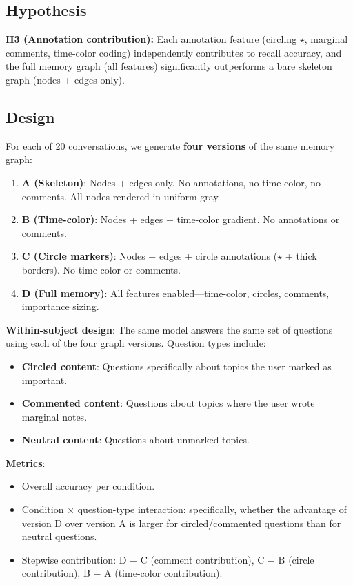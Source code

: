 \documentclass[11pt,a4paper]{article}
\begin{document}
\subsection{Hypothesis}

\textbf{H3 (Annotation contribution):} Each annotation feature (circling $\star$, marginal comments, time-color coding) independently contributes to recall accuracy, and the full memory graph (all features) significantly outperforms a bare skeleton graph (nodes + edges only).

\subsection{Design}

For each of 20 conversations, we generate \textbf{four versions} of the same memory graph:
\begin{enumerate}[nosep]
\item \textbf{A (Skeleton)}: Nodes + edges only. No annotations, no time-color, no comments. All nodes rendered in uniform gray.
\item \textbf{B (Time-color)}: Nodes + edges + time-color gradient. No annotations or comments.
\item \textbf{C (Circle markers)}: Nodes + edges + circle annotations ($\star$ + thick borders). No time-color or comments.
\item \textbf{D (Full memory)}: All features enabled---time-color, circles, comments, importance sizing.
\end{enumerate}

\textbf{Within-subject design}: The same model answers the same set of questions using each of the four graph versions. Question types include:
\begin{itemize}[nosep]
\item \textbf{Circled content}: Questions specifically about topics the user marked as important.
\item \textbf{Commented content}: Questions about topics where the user wrote marginal notes.
\item \textbf{Neutral content}: Questions about unmarked topics.
\end{itemize}

\textbf{Metrics}:
\begin{itemize}[nosep]
\item Overall accuracy per condition.
\item Condition $\times$ question-type interaction: specifically, whether the advantage of version D over version A is larger for circled/commented questions than for neutral questions.
\item Stepwise contribution: D $-$ C (comment contribution), C $-$ B (circle contribution), B $-$ A (time-color contribution).
\end{itemize}
\end{document}
